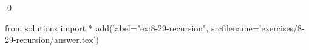 
\begin{ex}
  \label{ex:8-29-recursion}
  
  \qed
\end{ex}
\begin{python0}
from solutions import *
add(label="ex:8-29-recursion",
    srcfilename='exercises/8-29-recursion/answer.tex')
\end{python0}
